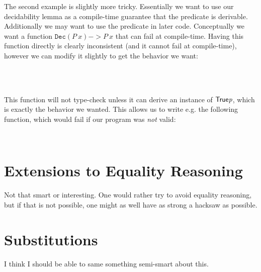 The second example is slightly more tricky. Essentially we want to use our
decidability lemma as a compile-time guarantee that the predicate is
derivable. Additionally we may want to use the predicate in later
code. Conceptually we want a function $\mathtt{Dec}(P\ x) -> P\ x$ that can fail at compile-time. Having this function directly is clearly inconsistent (and it cannot fail at compile-time), however we can modify it slightly to get the behavior we want:

\begin{code}
\> \AgdaSymbol{:}  \AgdaSymbol{\{}\AgdaSymbol{\}} \AgdaSymbol{\{} \AgdaSymbol{:}  \AgdaSymbol{\}} \<%
\\
\>[13]\<[14]%
\>[14]\AgdaSymbol{(} \AgdaSymbol{:}  \AgdaSymbol{)}  \AgdaSymbol{\{}\AgdaBound{\_} \AgdaSymbol{:}  \AgdaSymbol{\}} \<%
\\
\>[13]\<[14]%
\>[14]\<%
\end{code}

This function will not type-check unless it can derive an instance of
$\AgdaFunction{True} \AgdaBound{p}$, which is exactly the behavior we
wanted. This allows us to write e.g. the following function, which would fail if
our program was \emph{not} valid:

\begin{code}
\> \AgdaSymbol{:}   \<%
\\
\> \AgdaSymbol{=}  \AgdaSymbol{(} \AgdaSymbol{\_)}\<%
\end{code}

\section{Extensions to Equality Reasoning}
Not that smart or interesting. One would rather try to avoid equality reasoning,
but if that is not possible, one might as well have as strong a hacksaw as
possible.


\section{Substitutions}
I think I should be able to same something semi-smart about this.

